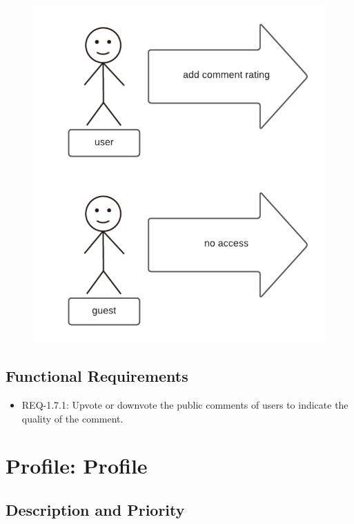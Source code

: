 \documentclass{scrreprt}
\begin{document}
\begin{figure}[H]\centering
    \includegraphics[width=\columnwidth]{response diagrams/Comments Rating.png}
\end{figure}

\subsection{\gls{Functional Requirements}}

\begin{itemize}
    \item REQ-1.7.1: Upvote or downvote the public comments of users to indicate the quality of the comment.
\end{itemize}

\section{Profile: Profile}

\subsection{Description and Priority}
\end{document}
